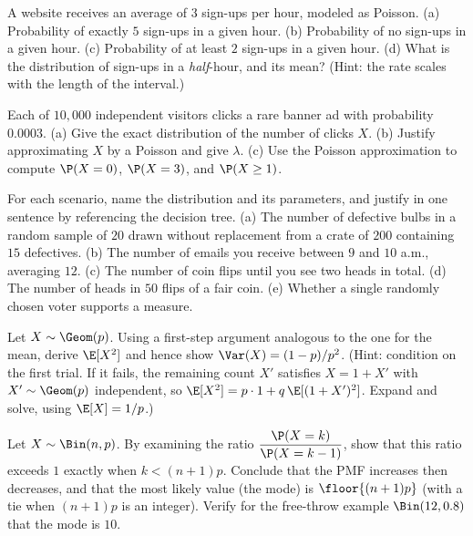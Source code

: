 \begin{exercise}
\label{ch07:exr-pois}
A website receives an average of $3$ sign-ups per hour, modeled as Poisson.
(a) Probability of exactly $5$ sign-ups in a given hour.
(b) Probability of no sign-ups in a given hour.
(c) Probability of at least $2$ sign-ups in a given hour.
(d) What is the distribution of sign-ups in a \emph{half}-hour, and its mean?
(Hint: the rate scales with the length of the interval.)
\end{exercise}

\begin{exercise}
\label{ch07:exr-poisapprox}
Each of $10{,}000$ independent visitors clicks a rare banner ad with probability
$0.0003$.
(a) Give the exact distribution of the number of clicks $X$.
(b) Justify approximating $X$ by a Poisson and give $\lambda$.
(c) Use the Poisson approximation to compute $\P(X = 0)$, $\P(X = 3)$, and
$\P(X \ge 1)$.
\end{exercise}

\begin{exercise}
\label{ch07:exr-which}
For each scenario, name the distribution and its parameters, and justify in one
sentence by referencing the decision tree.
(a) The number of defective bulbs in a random sample of $20$ drawn without
replacement from a crate of $200$ containing $15$ defectives.
(b) The number of emails you receive between $9$ and $10$ a.m., averaging $12$.
(c) The number of coin flips until you see two heads in total.
(d) The number of heads in $50$ flips of a fair coin.
(e) Whether a single randomly chosen voter supports a measure.
\end{exercise}

\begin{exercise}
\label{ch07:exr-geomvar}
Let $X \sim \Geom(p)$. Using a first-step argument analogous to the one for the
mean, derive $\E[X^2]$ and hence show $\Var(X) = (1-p)/p^2$.
(Hint: condition on the first trial. If it fails, the remaining count $X'$
satisfies $X = 1 + X'$ with $X' \sim \Geom(p)$ independent, so
$\E[X^2] = p\cdot 1 + q\,\E[(1+X')^2]$. Expand and solve, using $\E[X] = 1/p$.)
\end{exercise}

\begin{exercise}
\label{ch07:exr-binommode}
Let $X \sim \Bin(n,p)$. By examining the ratio
$\dfrac{\P(X=k)}{\P(X=k-1)}$, show that this ratio exceeds $1$ exactly when
$k < (n+1)p$. Conclude that the PMF increases then decreases, and that the most
likely value (the mode) is $\floor{(n+1)p}$ (with a tie when $(n+1)p$ is an
integer). Verify for the free-throw example $\Bin(12, 0.8)$ that the mode is $10$.
\end{exercise}

